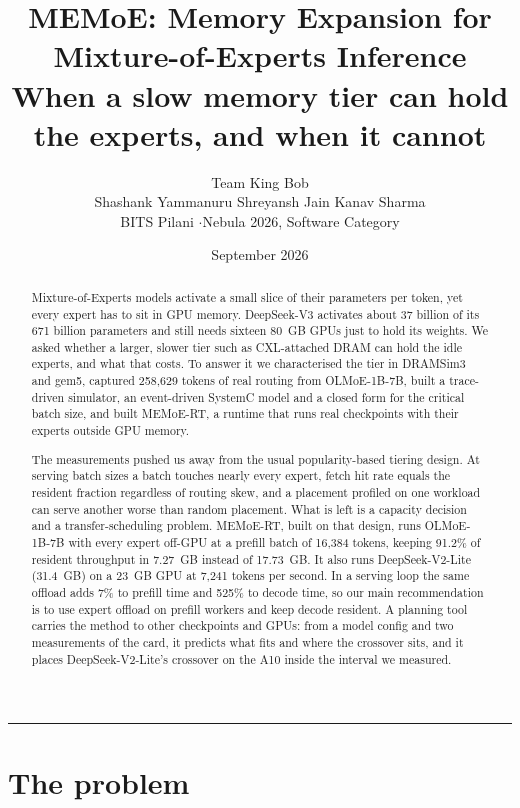 \documentclass[10pt,a4paper]{article}
\title{\vspace{-1.4cm}\textbf{MEMoE: Memory Expansion for Mixture-of-Experts Inference}\\[4pt]
\large When a slow memory tier can hold the experts, and when it cannot}
\author{Team King Bob\\
\small Shashank Yammanuru \quad Shreyansh Jain \quad Kanav Sharma\\
\small BITS Pilani \quad$\cdot$\quad Nebula 2026, Software Category}
\date{\small September 2026}
\begin{document}
\maketitle

\begin{abstract}
\noindent
Mixture-of-Experts models activate a small slice of their parameters per token,
yet every expert has to sit in GPU memory. DeepSeek-V3 activates about 37 billion
of its 671 billion parameters and still needs sixteen 80~GB GPUs just to hold its
weights. We asked whether a larger, slower tier such as CXL-attached DRAM can hold
the idle experts, and what that costs. To answer it we characterised the tier in
DRAMSim3 and gem5, captured 258{,}629 tokens of real routing from OLMoE-1B-7B,
built a trace-driven simulator, an event-driven SystemC model and a closed form
for the critical batch size, and built MEMoE-RT, a runtime that runs real
checkpoints with their experts outside GPU memory.

The measurements pushed us away from the usual popularity-based tiering design.
At serving batch sizes a batch touches nearly every expert, fetch hit rate equals
the resident fraction regardless of routing skew, and a placement profiled on one
workload can serve another worse than random placement. What is left is a
capacity decision and a transfer-scheduling problem. MEMoE-RT, built on that
design, runs OLMoE-1B-7B with every expert off-GPU at a prefill batch of
16{,}384 tokens, keeping 91.2\% of resident throughput in 7.27~GB instead of
17.73~GB. It also runs DeepSeek-V2-Lite (31.4~GB) on a 23~GB GPU at 7{,}241
tokens per second. In a serving loop the same offload adds 7\% to prefill time
and 525\% to decode time, so our main recommendation is to use expert offload on
prefill workers and keep decode resident. A planning tool carries the method to
other checkpoints and GPUs: from a model config and two measurements of the card,
it predicts what fits and where the crossover sits, and it places DeepSeek-V2-Lite's
crossover on the A10 inside the interval we measured.
\end{abstract}

\vspace{2pt}
\hrule
\vspace{8pt}

\section{The problem}
\end{document}
